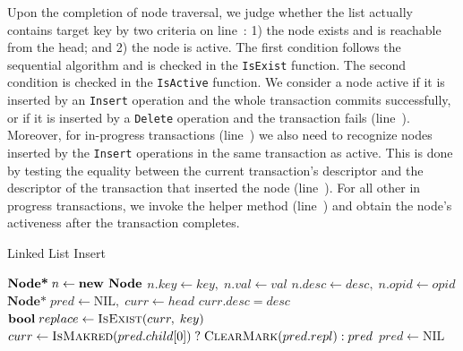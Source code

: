 \documentclass[10pt,conference,compsocconf]{IEEEtran}
\newcommand\NIL{\text{NIL}}
\newcommand\TRUE{\text{\textbf{true}}}
\begin{document}
Upon the completion of node traversal, we judge whether the list actually contains target key by two criteria on line~: 1) the node exists and is reachable from the head; and 2) the node is active.
The first condition follows the sequential algorithm and is checked in the \texttt{IsExist} function.
The second condition is checked in the \texttt{IsActive} function.
We consider a node active if it is inserted by an \texttt{Insert} operation and the whole transaction commits successfully, or if it is inserted by a \texttt{Delete} operation and the transaction fails (line~).
Moreover, for in-progress transactions (line~) we also need to recognize nodes inserted by the \texttt{Insert} operations in the same transaction as active. %
This is done by testing the equality between the current transaction's descriptor and the descriptor of the transaction that inserted the node (line~).
For all other in progress transactions, we invoke the helper method (line~) and obtain the node's activeness after the transaction completes. %

\begin{algorithm}[t]
    \caption{Linked List Insert}
    \label{alg:listinsert}
    \begin{algorithmic}[1]
        \State $\textbf{Node*}\; n \gets \text{\textbf{new Node}}$
        \State $n.key \gets key,\;n.val \gets val$
        \State $n.desc \gets desc,\;n.opid \gets opid$
        \State $\textbf{Node*}\; pred \gets \NIL,\;curr \gets head$
        \While{\TRUE} \label{l:listinsertwhile}
        \State {}
         \label{l:listinsertcontain}
        \State \Return $curr.desc = desc$ \label{l:listinsertdesc}
        \EndIf
        \State $\textbf{bool}\; replace \gets \Call{IsExist}{curr,\;key}$ \label{l:listinsertexist}
         \label{l:listinsertreplace}
        \State \Return \TRUE
        \Else
        \State $curr \gets \textsc{IsMakred}(pred.child[0]) \;?\; \hfill \break  \textsc{ClearMark}(pred.repl) : pred$ \label{l:listinsertpred}
        \State $pred \gets \NIL$ 
        \EndIf
        \EndWhile
        \EndFunction
    \end{algorithmic}
\end{algorithm}
\end{document}
